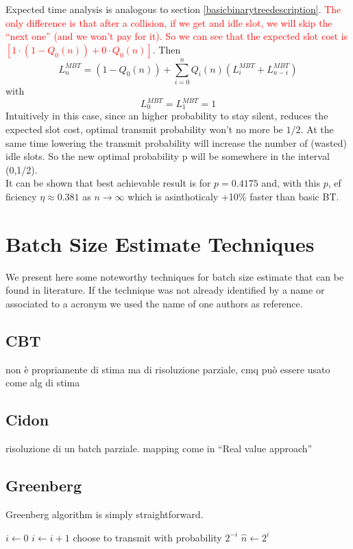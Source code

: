\documentclass[12pt,a4paper]{report}
\newcommand{\algname}[1]{\ensuremath{\mbox{\sc #1}}}
\begin{document}
Expected time analysis is analogous  to section \ref{basicbinarytreedescription}. \textcolor{red}{The only difference is that after a collision, if we get and idle slot, we will skip the ``next one'' (and we won't pay for it). So we can see that the expected slot cost is $\left[1 \cdot (1-Q_{0}(n))+ 0\cdot Q_{0}(n)\right]$}. Then\\
\begin{equation}
L_{n}^{MBT} = \left(1 - Q_{0}(n)\right)+\sum_{i=0}^{n} Q_{i}(n) (L_{i}^{MBT}+L_{n-i}^{MBT})
\end{equation}
with
\begin{equation*}
L_{0}^{MBT} = L_{1}^{MBT}  = 1
\end{equation*}
Intuitively in this case, since an higher probability to stay silent, reduces the expected slot cost, optimal transmit probability won't no more be $1/2$. At the same time lowering the transmit probability will increase the number of (wasted) idle slots. So the new optimal probability p will be somewhere in the interval (0,1/2).\\
It can be shown that best achievable result is for $p=0.4175$ and, with this $p$, ef ficiency $\eta \approx 0.381$ as $n \to \infty$ which is asinthoticaly +10\% faster than basic BT.
\chapter{Batch Size Estimate Techniques}
We present here some noteworthy techniques for batch size estimate that can be found in literature.
If the technique was not already identified by a name or associated to a acronym we used the name of one authors as reference.
\section{CBT}
non è propriamente di stima ma di risoluzione parziale, cmq può essere usato come alg di stima 
\section{Cidon}
risoluzione di un batch parziale. mapping come in ``Real value approach''
\section{Greenberg}

Greenberg algorithm is simply straightforward.
\begin{algorithm}[h!]
\begin{algorithmic}
\STATE $i\gets 0$
\REPEAT
	\STATE $i\gets i+1$ 
	\STATE choose to transmit with probability $2^{-i}$
\STATE $\hat{n} \gets 2^{i}$
\end{algorithmic}
\caption{\algname{Greenberg}}
\label{alg-greenberg}
\end{algorithm}
\end{document}
